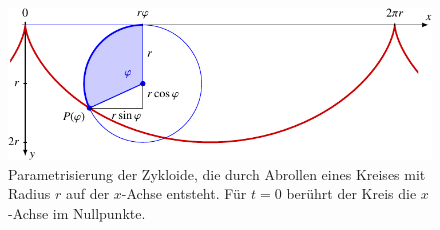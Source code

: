 %
%
%
\begin{figure}
\centering
\includegraphics{chapters/020-variation/images/zykloide.pdf}
\caption{Parametrisierung der Zykloide, die durch Abrollen eines
Kreises mit Radius $r$ auf der $x$-Achse entsteht.
Für $t=0$ berührt der Kreis die $x$-Achse im Nullpunkte.
\label{buch:variation:problem:fig:zykloide}}
\end{figure}
